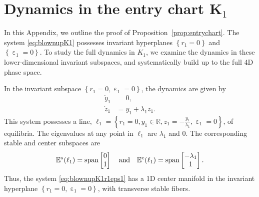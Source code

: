 \documentclass[10pt,onecolumn]{article}
\theoremstyle{plain}
\DeclareMathOperator{\eps}{\varepsilon}
\begin{document}



\appendix
\section{Dynamics in the entry chart $\boldsymbol K_1$} \label{appendix:entrychart}
In this Appendix, we outline the proof of Proposition~\ref{prop:entrychart}. The system \eqref{eq:blownupK1} possesses invariant hyperplanes $\left\{ r_1 = 0 \right\}$ and $\left\{ \eps_1=0 \right\}$. To study the full dynamics in $K_1$, we examine the dynamics in these lower-dimensional invariant subspaces, and systematically build up to the full 4D phase space. 

In the invariant subspace $\left\{ r_1=0, \eps_1=0 \right\}$, the dynamics are given by
%
\begin{equation}  \label{eq:blownupK1r1eps1}
  \begin{split}
      \dot y_1 &= 0, \\
      \dot z_1 &= y_1 + \lambda_1 z_1.
  \end{split}
\end{equation}
%
This system possesses a line, $\ell_1 = \left\{ r_1 = 0, y_1 \in \mathbb R, z_1 = -\tfrac{y_1}{\lambda_1}, \eps_1 = 0 \right\}$, of equilibria. The eigenvalues at any point in $\ell_1$ are $\lambda_1$ and $0$. The corresponding stable and center subspaces are 
%
\[ \mathbb E^s(\ell_1) = {\rm span} \begin{bmatrix} 0 \\ 1 \end{bmatrix} \quad {\rm and } \quad \mathbb E^c(\ell_1) = {\rm span} \begin{bmatrix} -\lambda_1 \\ 1 \end{bmatrix}. \]
%
Thus, the system \eqref{eq:blownupK1r1eps1} has a 1D center manifold in the invariant hyperplane $\left\{ r_1=0, \eps_1=0 \right\}$, with transverse stable fibers.
\end{document}
